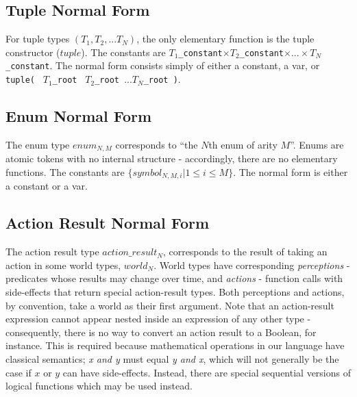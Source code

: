 \documentclass[letterpaper]{article}
\begin{document}
\subsection{Tuple Normal Form}

For tuple types $(T_1,T_2, ... T_N)$, the only elementary function is the tuple
constructor ($tuple$). The constants are $T_1$\verb|_constant|$ \times
T_2$\verb|_constant|$ \times ... \times T_N$\verb|_constant|. The normal form
consists simply of either a constant, a var, or \verb|tuple( |
$T_1$\verb|_root | $T_2$\verb|_root |$... T_N$\verb|_root )|.

\subsection{Enum Normal Form}

The enum type $enum_{N,M}$ corresponds to ``the $N$th enum of arity
$M$''. Enums are atomic tokens with no internal structure - accordingly, there
are no elementary functions. The constants are $\{symbol_{N,M,i}|1 \leq i \leq
M\}$. The normal form is either a constant or a var.

\subsection{Action Result Normal Form}

The action result type $action\_result_N$, corresponds to the result of taking
an action in some world types, $world_N$. World types have corresponding
\emph{perceptions} - predicates whose results may change over time, and
\emph{actions} - function calls with side-effects that return special
action-result types. Both perceptions and actions, by convention, take a world
as their first argument. Note that an action-result expression cannot appear
nested inside an expression of any other type - consequently, there is no way
to convert an action result to a Boolean, for instance. This is required
because mathematical operations in our language have classical semantics;
\emph{x and y} must equal \emph{y and x}, which will not generally be the case
if $x$ or $y$ can have side-effects. Instead, there are special sequential
versions of logical functions which may be used instead.
\end{document}
